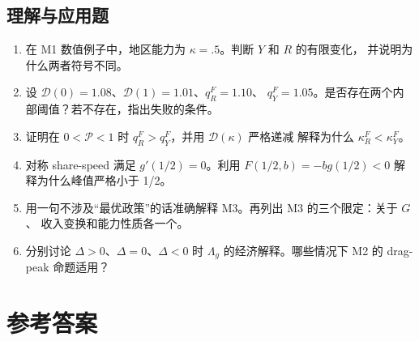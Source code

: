 \documentclass[UTF8,11pt,scheme=chinese,fontset=fandol]{ctexart}
\newcommand{\calD}{\mathcal D}
\newcommand{\calP}{\mathcal P}
\theoremstyle{definition}
\begin{document}
\subsection{理解与应用题}
\begin{enumerate}[resume]
  \item 在 M1 数值例子中，地区能力为 \(\kappa=.5\)。判断 \(Y\) 和 \(R\) 的有限变化，
  并说明为什么两者符号不同。

  \item 设 \(\calD(0)=1.08\)、\(\calD(1)=1.01\)、\(q_R^F=1.10\)、
  \(q_Y^F=1.05\)。是否存在两个内部阈值？若不存在，指出失败的条件。

  \item 证明在 \(0<\calP<1\) 时 \(q_R^F>q_Y^F\)，并用 \(\calD(\kappa)\) 严格递减
  解释为什么 \(\kappa_R^F<\kappa_Y^F\)。

  \item 对称 share-speed 满足 \(g'(1/2)=0\)。利用
  \(F(1/2,b)=-bg(1/2)<0\) 解释为什么峰值严格小于 1/2。

  \item 用一句不涉及“最优政策”的话准确解释 M3。再列出 M3 的三个限定：关于 \(G\)、
  收入变换和能力性质各一个。

  \item 分别讨论 \(\Delta>0\)、\(\Delta=0\)、\(\Delta<0\) 时
  \(\Lambda_g\) 的经济解释。哪些情况下 M2 的 drag-peak 命题适用？
\end{enumerate}

\clearpage
\section{参考答案}
\end{document}
